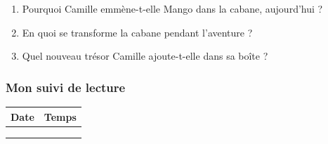 \documentclass[
  french,
  french,
  14pt,
  a4paper]{extarticle}
\providecommand{\tightlist}{%
  \setlength{\itemsep}{0pt}\setlength{\parskip}{0pt}}
\begin{document}
{\begin{enumerate}
\def\labelenumi{\arabic{enumi}.}
\tightlist
\item
  Pourquoi Camille emmène-t-elle Mango dans la cabane, aujourd'hui ?
\item
  En quoi se transforme la cabane pendant l'aventure ?
\item
  Quel nouveau trésor Camille ajoute-t-elle dans sa boîte ?
\end{enumerate}

\subsubsection{Mon suivi de lecture}\label{mon-suivi-de-lecture-5}

\begin{center}
\begin{tabularx}{\textwidth}{|X|X|}
\hline
\textbf{Date} & \textbf{Temps} \\
\hline
& \\
\hline
& \\
\hline
& \\
\hline
\end{tabularx}
\end{center}

}%
\newpage
\end{document}
